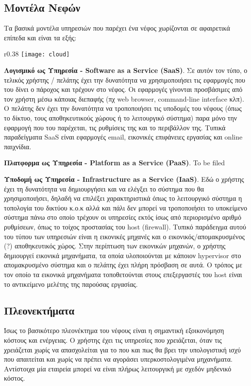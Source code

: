 \subsection{Μοντέλα Νεφών}
Τα βασικά μοντέλα υπηρεσιών που παρέχει ένα νέφος χωρίζονται σε αφαιρετικά
επίπεδα και είναι τα εξής:

\begin{wrapfigure}{r}{0.38\textwidth}
	\centering
	\texttt{[image: cloud]}
\end{wrapfigure}

\textbf{Λογισμικό ως Υπηρεσία - Software as a Service (SaaS)}. Σε αυτόν τον
τύπο, ο τελικός χρήστης / πελάτης έχει την δυνατότητα να χρησιμοποιήσει τις
εφαρμογές που του δίνει ο πάροχος και τρέχουν στο νέφος. Οι εφαρμογές γίνονται
προσβάσιμες από τον χρήστη μέσω κάποιας διεπαφής (πχ web browser, command-line
interface κλπ). Ο πελάτης δεν έχει την δυνατότητα να τροποποιήσει τις υποδομές
του νέφους (όπως το δίκτυο, τους αποθηκευτικούς χώρους ή το λειτουργικό σύστημα)
παρα μόνο την εφαρμογή που του παρέχεται, τις ρυθμίσεις της και το περιβάλλον
της. Τυπικά παραδείγματα SaaS είναι εφαρμογές email, εικονικές επιφάνειες
εργασίας και online παιχνίδια.

\textbf{Πλατφορμα ως Υπηρεσία - Platform as a Service (PaaS)}. %
To be filed

\textbf{Υποδομή ως Υπηρεσία - Infrastructure as a Service (IaaS)}. Εδώ ο
χρήστης έχει τη δυνατότητα να δημιουργήσει και να ελέγξει το σύστημα που θα
χρησιμοποιήσει, δηλαδή να επιλέξει χαρακτηριστικά όπως το λειτουργικό σύστημα η
τοπολογία του δικτύου κ.ο.κ αλλά και πάλι δεν μπορεί να τροποποιήσει το
υποκείμενο σύστημα πάνω στο οποίο τρέχουν οι υπηρεσίες εκτός ίσως από
περιορισμένο αριθμό ρυθμίσεων, όπως το τοίχος προστασίας του host (firewall).
Τυπικό παράδειγμα αυτού του τύπου των υπηρεσιών είναι η εικονικές μηχανές και ο
εικονικός/απομακρυσμένος (?) αποθηκευτικός χώρος. Στην περίπτωση των εικονικών
μηχανών, ο χρήστης δημιουργεί εικονικά μηχανήματα, τα οποία υλοποιούνται με
κάποιον hypervisor στο απομακρυσμένο σύστημα και ο πελάτης έχει πλήρη πρόσβαση
σε αυτά. Ο τρόπος με τον οποίο τα εικονικά μηχανήματα τοποθετούνται στους
επεξεργαστές του host είναι το αντικείμενο μελέτης της παρούσας εργασίας.

\subsection{Πλεονεκτήματα}
Ίσως το βασικότερο πλεονέκτημα του νέφους είναι η σημαντική εξοικονόμηση κόστους
και ενέργειας. Ο χρήστης έχει τις υπηρεσίες που χρειάζεται, όταν τις χρειάζεται
χωρίς να απασχολείται για το που και πως θα βρει την υπολογιστική ισχύ που
απαιτείται και χωρίς να πρέπει να αγοράσει υπερκοστολογιμένα μηχανήματα.
Αντίστοιχα μία εταιρεία μπορεί να είναι πλήρως λειτουργική με σχεδόν μηδενικό
κόστος.

